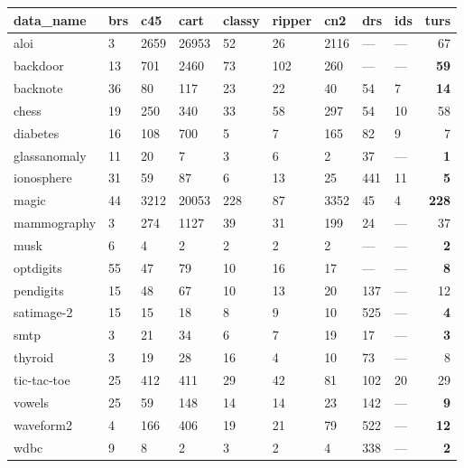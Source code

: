 \begin{table}[ht]
\centering
\begin{tabular}{lllllllll|r}
  \hline
data\_name & brs & c45 & cart & classy & ripper & cn2 & drs & ids & turs \\ 
  \hline
aloi & \scriptsize{3} & \scriptsize{2659} & 26953 & 52 & \scriptsize{26} & 2116 & --- & --- & 67 \\ 
  backdoor & \scriptsize{13} & 701 & 2460 & 73 & 102 & 260 & --- & --- & \textbf{59} \\ 
  backnote & 36 & 80 & 117 & 23 & 22 & 40 & 54 & \scriptsize{7} & \textbf{14} \\ 
  chess & 19 & 250 & 340 & 33 & 58 & \scriptsize{297} & \scriptsize{54} & \scriptsize{10} & 58 \\ 
  diabetes & 16 & 108 & \scriptsize{700} & 5 & \scriptsize{7} & 165 & 82 & \scriptsize{9} & 7 \\ 
  glassanomaly & \scriptsize{11} & \scriptsize{20} & \scriptsize{7} & \scriptsize{3} & \scriptsize{6} & 2 & 37 & --- & \textbf{1} \\ 
  ionosphere & \scriptsize{31} & 59 & \scriptsize{87} & 6 & 13 & 25 & \scriptsize{441} & \scriptsize{11} & \textbf{5} \\ 
  magic & \scriptsize{44} & 3212 & \scriptsize{20053} & 228 & \scriptsize{87} & \scriptsize{3352} & \scriptsize{45} & \scriptsize{4} & \textbf{228} \\ 
  mammography & \scriptsize{3} & \scriptsize{274} & \scriptsize{1127} & 39 & \scriptsize{31} & 199 & 24 & --- & 37 \\ 
  musk & 6 & 4 & 2 & 2 & 2 & 2 & --- & --- & \textbf{2} \\ 
  optdigits & \scriptsize{55} & 47 & 79 & 10 & 16 & 17 & --- & --- & \textbf{8} \\ 
  pendigits & 15 & 48 & 67 & 10 & 13 & 20 & 137 & --- & 12 \\ 
  satimage-2 & 15 & 15 & 18 & 8 & 9 & 10 & \scriptsize{525} & --- & \textbf{4} \\ 
  smtp & \scriptsize{3} & 21 & 34 & \scriptsize{6} & 7 & \scriptsize{19} & \scriptsize{17} & --- & \textbf{3} \\ 
  thyroid & \scriptsize{3} & 19 & 28 & 16 & 4 & 10 & 73 & --- & 8 \\ 
  tic-tac-toe & 25 & \scriptsize{412} & 411 & 29 & 42 & 81 & 102 & \scriptsize{20} & 29 \\ 
  vowels & 25 & \scriptsize{59} & 148 & 14 & \scriptsize{14} & 23 & 142 & --- & \textbf{9} \\ 
  waveform2 & \scriptsize{4} & \scriptsize{166} & \scriptsize{406} & 19 & \scriptsize{21} & 79 & \scriptsize{522} & --- & \textbf{12} \\ 
  wdbc & \scriptsize{9} & 8 & \scriptsize{2} & \scriptsize{3} & 2 & \scriptsize{4} & \scriptsize{338} & --- & \textbf{2} \\ 
  \hline
  

\end{tabular}
\end{table}
